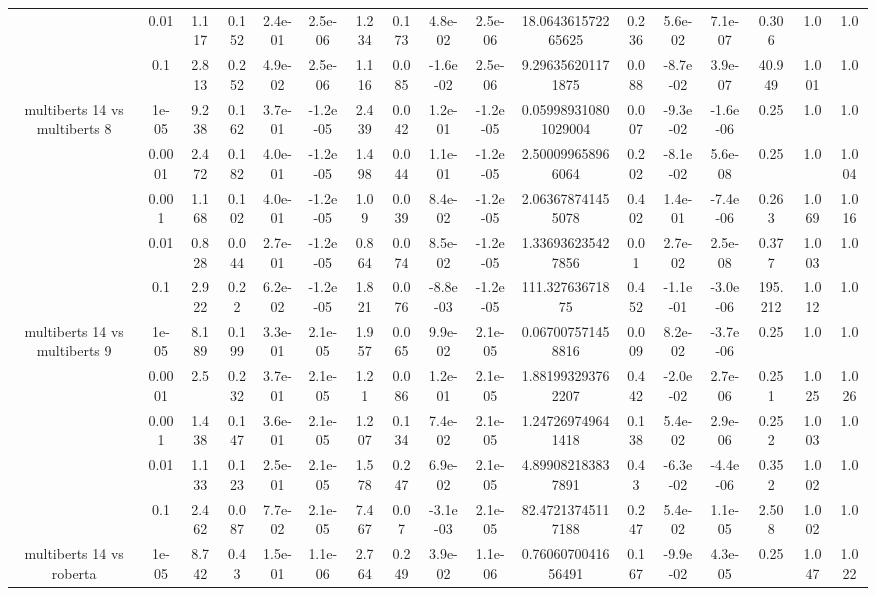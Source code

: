 \begin{tabular}{|c|c|c|c|c|c|c|c|c|c|c|c|c|c|c|c|c|}
 & 0.01 & 1.117 & 0.152 & 2.4e-01 & 2.5e-06 & 1.234 & 0.173 & 4.8e-02 & 2.5e-06 & 18.064361572265625 & 0.236 & 5.6e-02 & 7.1e-07 & 0.306 & 1.0 & 1.0 \\
 & 0.1 & 2.813 & 0.252 & 4.9e-02 & 2.5e-06 & 1.116 & 0.085 & -1.6e-02 & 2.5e-06 & 9.296356201171875 & 0.088 & -8.7e-02 & 3.9e-07 & 40.949 & 1.001 & 1.0 \\
\hline
\multirow{5}{*}{multiberts 14 vs multiberts 8} & 1e-05 & 9.238 & 0.162 & 3.7e-01 & -1.2e-05 & 2.439 & 0.042 & 1.2e-01 & -1.2e-05 & 0.059989310801029004 & 0.007 & -9.3e-02 & -1.6e-06 & 0.25 & 1.0 & 1.0 \\
 & 0.0001 & 2.472 & 0.182 & 4.0e-01 & -1.2e-05 & 1.498 & 0.044 & 1.1e-01 & -1.2e-05 & 2.500099658966064 & 0.202 & -8.1e-02 & 5.6e-08 & 0.25 & 1.0 & 1.004 \\
 & 0.001 & 1.168 & 0.102 & 4.0e-01 & -1.2e-05 & 1.09 & 0.039 & 8.4e-02 & -1.2e-05 & 2.063678741455078 & 0.402 & 1.4e-01 & -7.4e-06 & 0.263 & 1.069 & 1.016 \\
 & 0.01 & 0.828 & 0.044 & 2.7e-01 & -1.2e-05 & 0.864 & 0.074 & 8.5e-02 & -1.2e-05 & 1.336936235427856 & 0.01 & 2.7e-02 & 2.5e-08 & 0.377 & 1.003 & 1.0 \\
 & 0.1 & 2.922 & 0.22 & 6.2e-02 & -1.2e-05 & 1.821 & 0.076 & -8.8e-03 & -1.2e-05 & 111.32763671875 & 0.452 & -1.1e-01 & -3.0e-06 & 195.212 & 1.012 & 1.0 \\
\hline
\multirow{5}{*}{multiberts 14 vs multiberts 9} & 1e-05 & 8.189 & 0.199 & 3.3e-01 & 2.1e-05 & 1.957 & 0.065 & 9.9e-02 & 2.1e-05 & 0.067007571458816 & 0.009 & 8.2e-02 & -3.7e-06 & 0.25 & 1.0 & 1.0 \\
 & 0.0001 & 2.5 & 0.232 & 3.7e-01 & 2.1e-05 & 1.21 & 0.086 & 1.2e-01 & 2.1e-05 & 1.881993293762207 & 0.442 & -2.0e-02 & 2.7e-06 & 0.251 & 1.025 & 1.026 \\
 & 0.001 & 1.438 & 0.147 & 3.6e-01 & 2.1e-05 & 1.207 & 0.134 & 7.4e-02 & 2.1e-05 & 1.247269749641418 & 0.138 & 5.4e-02 & 2.9e-06 & 0.252 & 1.003 & 1.0 \\
 & 0.01 & 1.133 & 0.123 & 2.5e-01 & 2.1e-05 & 1.578 & 0.247 & 6.9e-02 & 2.1e-05 & 4.899082183837891 & 0.43 & -6.3e-02 & -4.4e-06 & 0.352 & 1.002 & 1.0 \\
 & 0.1 & 2.462 & 0.087 & 7.7e-02 & 2.1e-05 & 7.467 & 0.07 & -3.1e-03 & 2.1e-05 & 82.47213745117188 & 0.247 & 5.4e-02 & 1.1e-05 & 2.508 & 1.002 & 1.0 \\
\hline
\multirow{5}{*}{multiberts 14 vs roberta } & 1e-05 & 8.742 & 0.43 & 1.5e-01 & 1.1e-06 & 2.764 & 0.249 & 3.9e-02 & 1.1e-06 & 0.7606070041656491 & 0.167 & -9.9e-02 & 4.3e-05 & 0.25 & 1.047 & 1.022 \\

\end{tabular}
